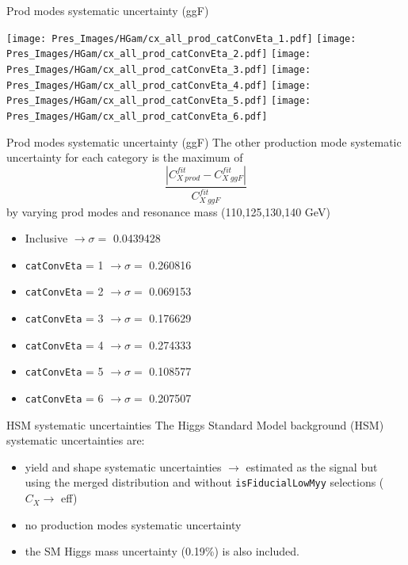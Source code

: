 \documentclass[10pt,UKenglish, leqno, xcolor = dvipsnames]{beamer}
\begin{document}
	
	\begin{frame}{Prod modes systematic uncertainty (ggF)}
		\vfill
		\begin{center}
			\texttt{[image: Pres\_Images/HGam/cx\_all\_prod\_catConvEta\_1.pdf]}
			\texttt{[image: Pres\_Images/HGam/cx\_all\_prod\_catConvEta\_2.pdf]}
			\texttt{[image: Pres\_Images/HGam/cx\_all\_prod\_catConvEta\_3.pdf]}
			\texttt{[image: Pres\_Images/HGam/cx\_all\_prod\_catConvEta\_4.pdf]}
			\texttt{[image: Pres\_Images/HGam/cx\_all\_prod\_catConvEta\_5.pdf]}
			\texttt{[image: Pres\_Images/HGam/cx\_all\_prod\_catConvEta\_6.pdf]}
		\end{center}
	\end{frame}
	
	\begin{frame}{Prod modes systematic uncertainty (ggF)}
		\vfill
		The other production mode systematic uncertainty for each category is the maximum of  $$\dfrac{|C^{fit}_{X\ prod}-C^{fit}_{X\ ggF}|}{C^{fit}_{X\ ggF}}$$ by varying prod modes and resonance mass (110,125,130,140 GeV)
		
		\begin{itemize}
			\item Inclusive		 $\to \sigma=$ 0.0439428
			\item \texttt{catConvEta} = 1 $\to \sigma=$ 0.260816
			\item \texttt{catConvEta} = 2 $\to \sigma=$ 0.069153
			\item \texttt{catConvEta} = 3 $\to \sigma=$ 0.176629
			\item \texttt{catConvEta} = 4 $\to \sigma=$ 0.274333
			\item \texttt{catConvEta} = 5 $\to \sigma=$ 0.108577
			\item \texttt{catConvEta} = 6 $\to \sigma=$ 0.207507
		\end{itemize}
		\vfill
	\end{frame}

	\begin{frame}{HSM systematic uncertainties}
		\vfill
		The Higgs Standard Model background (HSM) systematic uncertainties are:
		\begin{itemize}
			\item yield and shape systematic uncertainties $\to$ estimated as the signal but using the merged distribution and without \texttt{isFiducialLowMyy} selections ($C_X \to$ eff)
			\item no production modes systematic uncertainty
			\item the SM Higgs mass uncertainty (0.19\%) is also included.
		\end{itemize}
		\vfill
	\end{frame}
\end{document}
